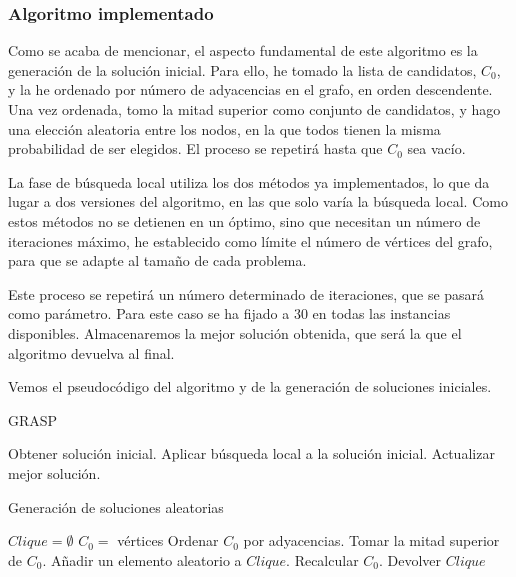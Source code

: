 \subsubsection{Algoritmo implementado}

Como se acaba de mencionar, el aspecto fundamental de este algoritmo es la generación de
la solución inicial. Para ello, he tomado la lista de candidatos, $C_0$, y la he ordenado
por número de adyacencias en el grafo, en orden descendente. Una vez ordenada, tomo la
mitad superior como conjunto de candidatos, y hago una elección aleatoria entre los nodos,
en la que todos tienen la misma probabilidad de ser elegidos. El proceso se repetirá hasta
que $C_0$ sea vacío.

La fase de búsqueda local utiliza los dos métodos ya implementados, lo que da lugar a
dos versiones del algoritmo, en las que solo varía la búsqueda local. Como estos métodos
no se detienen en un óptimo, sino que necesitan un número de iteraciones máximo, he
establecido como límite el número de vértices del grafo, para que se adapte al tamaño
de cada problema.

Este proceso se repetirá un número determinado de iteraciones, que se pasará como parámetro.
Para este caso se ha fijado a $30$ en todas las instancias disponibles. Almacenaremos la
mejor solución obtenida, que será la que el algoritmo devuelva al final.

Vemos el pseudocódigo del algoritmo y de la generación de soluciones iniciales.

\begin{algorithm}[H]
\caption{GRASP}
  \begin{algorithmic}
  \Repeat
    \State Obtener solución inicial.
    \State Aplicar búsqueda local a la solución inicial.
    \State Actualizar mejor solución.
  \end{algorithmic}
\end{algorithm}

\begin{algorithm}[H]
\caption{Generación de soluciones aleatorias}
  \begin{algorithmic}
    \State $Clique = \emptyset$
    \State $C_0 =$ vértices
    \Repeat
      \State Ordenar $C_0$ por adyacencias.
      \State Tomar la mitad superior de $C_0$.
      \State Añadir un elemento aleatorio a $Clique$.
      \State Recalcular $C_0$.
    \State Devolver $Clique$
  \end{algorithmic}
\end{algorithm}


